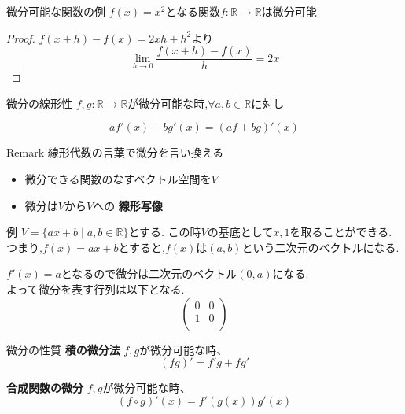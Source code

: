 \begin{frame}{微分可能な関数の例}
$f(x) = x^2$となる関数$f:\mathbb{R} \to \mathbb{R}$は微分可能
\begin{proof}
$f(x+h) - f(x) = 2xh + h^2$より
\begin{equation*}
\lim_{h \to 0} \frac{f(x+h) - f(x)}{h} = 2x
\end{equation*}
\end{proof}

\end{frame}
\begin{frame}{微分の線形性}
$f, g:\mathbb{R} \to \mathbb{R}$が微分可能な時,$\forall a, b \in \mathbb{R}$に対し

  \begin{equation*}
  af'(x) + bg'(x)  = (af+bg)'(x)
  \end{equation*}

\end{frame}

\begin{frame}{Remark}
線形代数の言葉で微分を言い換える
\begin{itemize}
\item  微分できる関数のなすベクトル空間を$V$
\item 微分は$V$から$V$への \textbf{線形写像}
\end{itemize}
例 $V = \{ax +b \mid a, b \in \mathbb{R}\}$とする.
この時$V$の基底として$x, 1$を取ることができる.
つまり,$f(x) = ax + b$とすると,$f(x)$は$(a, b)$という二次元のベクトルになる.

$f'(x) = a$となるので微分は二次元のベクトル$(0, a)$になる. \\
よって微分を表す行列は以下となる.
$$
\begin{pmatrix}
0 & 0 \\
1 & 0 \\
\end{pmatrix}
$$
\end{frame}

\begin{frame}{微分の性質}
\textbf{積の微分法}
$f, g$が微分可能な時、
  \begin{equation*}
  (fg)' = f'g + fg'
  \end{equation*}

\textbf{合成関数の微分}
  $f,g$が微分可能な時、
  \begin{equation*}
  (f \circ g)'(x) = f'(g(x))g'(x)
  \end{equation*}

\end{frame}

